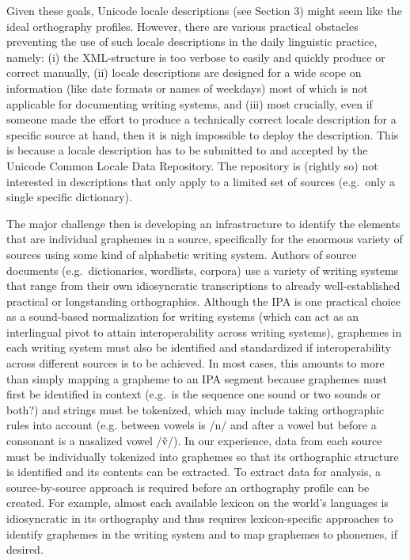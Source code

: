 Given these goals, Unicode locale descriptions (see Section 3) might seem like the ideal orthography profiles. However, there are various practical obstacles preventing the use of such locale descriptions in the daily linguistic practice, namely: (i) the XML-structure is too verbose to easily and quickly produce or correct manually, (ii) locale descriptions are designed for a wide scope on information (like date formats or names of weekdays) most of which is not applicable for documenting writing systems, and (iii) most crucially, even if someone made the effort to produce a technically correct locale description for a specific source at hand, then it is nigh impossible to deploy the description. This is because a locale description has to be submitted to and accepted by the Unicode Common Locale Data Repository. The repository is (rightly so) not interested in descriptions that only apply to a limited set of sources (e.g.~only a single specific dictionary).

The major challenge then is developing an infrastructure to identify the elements that are individual graphemes in a source, specifically for the enormous variety of sources using some kind of alphabetic writing system. Authors of source documents (e.g.~dictionaries, wordlists, corpora) use a variety of writing systems that range from their own idiosyncratic transcriptions to already well-established practical or longstanding orthographies. Although the IPA is one practical choice as a sound-based normalization for writing systems (which can act as an interlingual pivot to attain interoperability across writing systems), graphemes in each writing system must also be identified and standardized if interoperability across different sources is to be achieved. In most cases, this amounts to more than simply mapping a grapheme to an IPA segment because graphemes must first be identified in context (e.g.~is the sequence one sound or two sounds or both?) and strings must be tokenized, which may include taking orthographic rules into account (e.g. between vowels is /n/ and after a vowel but before a consonant is a nasalized vowel /ṽ/). In our experience, data from each source must be individually tokenized into graphemes so that its orthographic structure is identified and its contents can be extracted. To extract data for analysis, a source-by-source approach is required before an orthography profile can be created. For example, almost each available lexicon on the world's languages is idiosyncratic in its orthography and thus requires lexicon-specific approaches to identify graphemes in the writing system and to map graphemes to phonemes, if desired.

